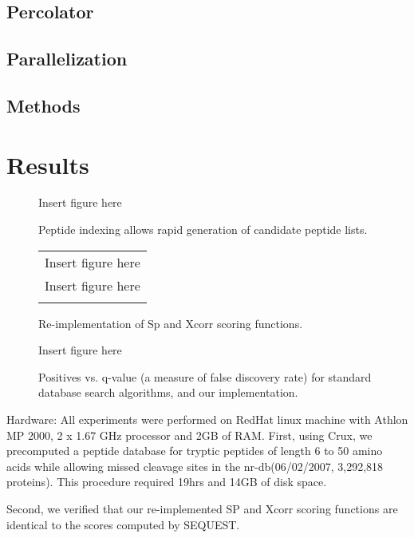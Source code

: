 \documentclass{bioinfo}
\begin{document}
\begin{itemize}
\subsection{Percolator}
\subsection{Parallelization}

\begin{methods}
\section{Methods}

\end{methods}

\section{Results}

\begin{figure}
  \centering
  Insert figure here
  \caption{Peptide indexing allows rapid generation of candidate peptide
  lists.}
  \label{figure:indexing}
\end{figure}

\begin{figure}
  \centering
  \begin{tabular}{c}
  Insert figure here \\
  Insert figure here \\
  \caption{Re-implementation of Sp and Xcorr scoring functions.}
  \label{figure:indexing}
  \end{tabular}
\end{figure}

\begin{figure}
  \centering
  Insert figure here
  \caption{Positives vs. q-value (a measure of false discovery rate) for
  standard database search algorithms, and our implementation.}
  \label{figure:indexing}
\end{figure}

Hardware: All experiments were performed on RedHat linux machine with
Athlon MP 2000, 2 x 1.67 GHz processor and 2GB of RAM.  First, using
Crux, we precomputed a peptide database for tryptic peptides of length
6 to 50 amino acids while allowing missed cleavage sites in the
nr-db(06/02/2007, 3,292,818 proteins). This procedure required 19hrs
and 14GB of disk space.

Second, we verified that our re-implemented SP and Xcorr scoring
functions are identical to the scores computed by SEQUEST.


\end{itemize}
\end{document}
